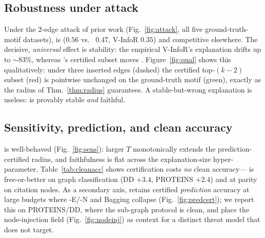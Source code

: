 \subsection{Robustness under attack}
\label{sec:exp-attack}
Under the $2$-edge attack of prior work (Fig.~\ref{fig:attack}, all five
ground-truth-motif datasets), \aeth{} is  ($0.56$ vs.\ \xgn{} $0.47$, V-InfoR $0.35$) and competitive
elsewhere. The decisive, \emph{universal} effect is stability: the empirical
V-InfoR's explanation \textcolor{vinfomag}{drifts up to $\sim83\%$}, whereas
\aeth{}'s certified subset moves . Figure~\ref{fig:qual} shows this qualitatively: under
three inserted edges (dashed) the certified top-$(k{-}2)$ subset (red) is
pointwise unchanged on the ground-truth motif (green), exactly as the radius of
Thm.~\ref{thm:radius} guarantees. A stable-but-wrong explanation is useless:
\aeth{} is provably stable \emph{and} faithful.

\subsection{Sensitivity, prediction, and clean accuracy}
\label{sec:exp-misc}
\aeth{} is well-behaved (Fig.~\ref{fig:sens}): larger $T$ monotonically extends
the prediction-certified radius, and faithfulness is flat across the
explanation-size hyper-parameter. Table~\ref{tab:cleanacc} shows certification
costs \emph{no} clean accuracy---\aeth{} is free-or-better on graph
classification (DD $+3.4$, PROTEINS $+2.4$) and at parity on citation nodes. As a
secondary axis, \aeth{} retains certified \emph{prediction} accuracy at large
budgets where \pgn{}-E/-N and Bagging collapse (Fig.~\ref{fig:predcert}); we
report this on PROTEINS/DD, where the sub-graph protocol is clean, and place the
node-injection field (Fig.~\ref{fig:nodeinj}) as context for a distinct threat
model that \aeth{} does not target.


